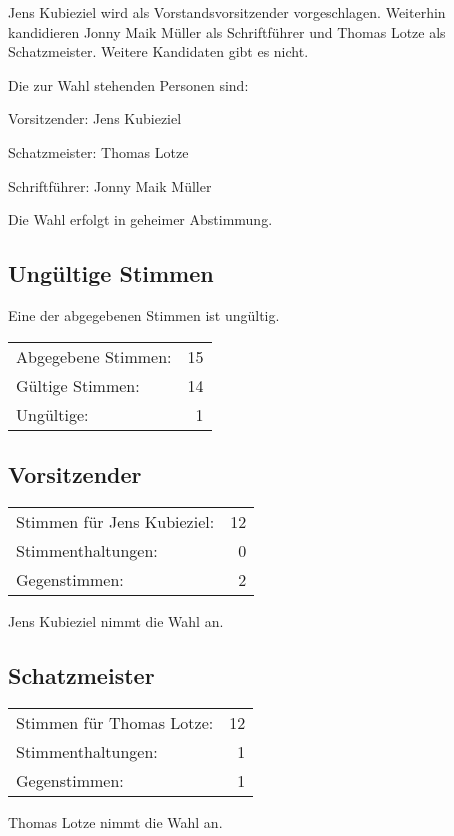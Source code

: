 \documentclass[DIV=calc,parksip=half*]{scrartcl}
\newcommand{\qbi}{Jens Kubieziel}
\newcommand{\jonny}{Jonny Maik Müller}
\newcommand{\thomas}{Thomas Lotze}
\begin{document}
\qbi{} wird als Vorstandsvorsitzender vorgeschlagen. Weiterhin kandidieren
\jonny{} als Schriftführer und \thomas{} als Schatzmeister. Weitere Kandidaten
gibt es nicht.

Die zur Wahl stehenden Personen sind:
\begin{compactenum}
\item Vorsitzender: \qbi{}
\item Schatzmeister: \thomas{}
\item Schriftführer: \jonny{}
\end{compactenum}

Die Wahl erfolgt in geheimer Abstimmung.

\subsection*{Ungültige Stimmen}

Eine der abgegebenen Stimmen ist ungültig.

\begin{tabularx}{\linewidth}{Xr}
Abgegebene Stimmen: & 15 \\
  Gültige Stimmen: & 14 \\
  Ungültige: & 1\\
\end{tabularx}

\subsection{Vorsitzender}
\begin{tabularx}{\linewidth}{Xr}
Stimmen für \qbi{}: & 12 \\
  Stimmenthaltungen: & 0 \\
  Gegenstimmen: & 2\\
\end{tabularx}
\qbi{} nimmt die Wahl an.

\subsection{Schatzmeister}
\begin{tabularx}{\linewidth}{Xr}
Stimmen für \thomas{}: & 12\\
Stimmenthaltungen: & 1 \\
Gegenstimmen: & 1
\end{tabularx}
\thomas{} nimmt die Wahl an.
\end{document}
